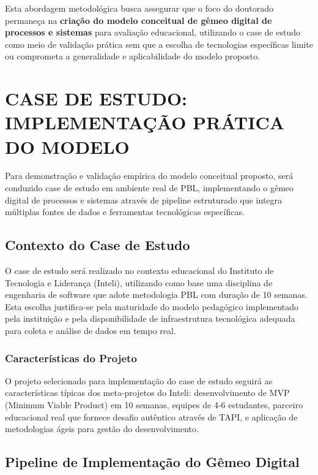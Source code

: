 \documentclass[12pt,a4paper]{article}
\begin{document}
Esta abordagem metodológica busca assegurar que o foco do doutorado permaneça na \textbf{criação do modelo conceitual de gêmeo digital de processos e sistemas} para avaliação educacional, utilizando o case de estudo como meio de validação prática sem que a escolha de tecnologias específicas limite ou comprometa a generalidade e aplicabilidade do modelo proposto.

\section{CASE DE ESTUDO: IMPLEMENTAÇÃO PRÁTICA DO MODELO}

Para demonstração e validação empírica do modelo conceitual proposto, será conduzido case de estudo em ambiente real de PBL, implementando o gêmeo digital de processos e sistemas através de pipeline estruturado que integra múltiplas fontes de dados e ferramentas tecnológicas específicas.

\subsection{Contexto do Case de Estudo}

O case de estudo será realizado no contexto educacional do Instituto de Tecnologia e Liderança (Inteli), utilizando como base uma disciplina de engenharia de software que adote metodologia PBL com duração de 10 semanas. Esta escolha justifica-se pela maturidade do modelo pedagógico implementado pela instituição \cite{inteli2024} e pela disponibilidade de infraestrutura tecnológica adequada para coleta e análise de dados em tempo real.

\subsubsection{Características do Projeto}

O projeto selecionado para implementação do case de estudo seguirá as características típicas dos meta-projetos do Inteli: desenvolvimento de MVP (Minimum Viable Product) em 10 semanas, equipes de 4-6 estudantes, parceiro educacional real que fornece desafio autêntico através de TAPI, e aplicação de metodologias ágeis para gestão do desenvolvimento.

\subsection{Pipeline de Implementação do Gêmeo Digital}
\end{document}
